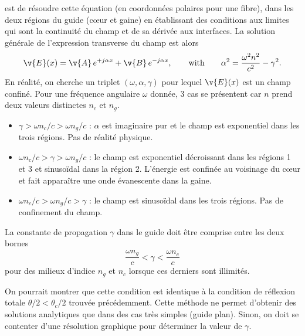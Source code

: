 est de résoudre cette équation (en coordonnées polaires pour une fibre), dans
les deux régions du guide (cœur et gaine) en établissant des conditions aux
limites qui sont la continuité du champ et de sa dérivée aux interfaces. La
solution générale de l'expression transverse du champ est alors
\begin{equation*}
  \v{E}(x) = \v{A}\,e^{+j\alpha x} + \v{B}\,e^{-j\alpha x},
  \qquad\text{with}\qquad
  \alpha^2 = \frac{\omega^2 n^2}{c^2} - \gamma^2 .
\end{equation*}
En réalité, on cherche un triplet $(\omega,\alpha,\gamma)$ pour lequel
$\v{E}(x)$ est un champ confiné. Pour une fréquence angulaire $\omega$ donnée,
3 cas se présentent car $n$ prend deux valeurs distinctes $n_c$ et $n_g$.

\begin{itemize}
  \item $\gamma > \omega n_c/c > \omega n_g/c$ : $\alpha$ est imaginaire pur et
    le champ est exponentiel dans les trois régions. Pas de réalité physique.
  \item $\omega n_c/c > \gamma > \omega n_g/c$ : le champ est exponentiel
    décroissant dans les régions 1 et 3 et sinusoïdal dans la région 2.
    L'énergie est confinée au voisinage du cœur et fait apparaître une onde
    évanescente dans la gaine.
  \item $\omega n_c/c > \omega n_g/c > \gamma$ : le champ est sinusoïdal dans
    les trois régions. Pas de confinement du champ.
\end{itemize}

\begin{theorem}
  La constante de propagation $\gamma$ dans le guide doit être comprise entre
  les deux bornes
  \begin{equation*}
    \frac{\omega n_g}{c} < \gamma < \frac{\omega n_c}{c}
  \end{equation*}
  pour des milieux d'indice $n_g$ et $n_c$ lorsque ces derniers sont illimités.
\end{theorem}

\begin{remark}
  On pourrait montrer que cette condition est identique à la condition de
  réflexion totale $\theta/2 < \theta_c/2$ trouvée précédemment. Cette méthode
  ne permet d'obtenir des solutions analytiques que dans des cas très simples
  (guide plan). Sinon, on doit se contenter d'une résolution graphique pour
  déterminer la valeur de $\gamma$.
\end{remark}

